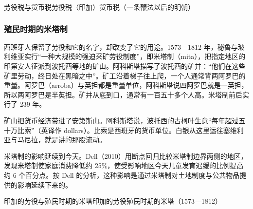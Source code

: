 \begin{compare}{劳役税与货币税}{劳役税（印加）}{货币税（一条鞭法以后的明朝）}
\end{compare}

\subsubsection{殖民时期的米塔制}
西班牙人保留了劳役和它的名字，却改变了它的用途。1573—1812 年，秘鲁与玻利维亚实行“一种大规模的强迫采矿劳役制度”，即米塔制（mita）\cite{dell2010}，把指定地区的印第安人征派到波托西等地的矿山。阿科斯塔描写了波托西的矿井：“他们在这些矿里劳动，终日处在黑暗之中”\cite{acosta1880}。矿工沿着梯子往上爬，一个人通常背两阿罗巴的重量。阿罗巴（arroba）与英担都是重量单位，阿科斯塔说四阿罗巴就是一英担，所以两阿罗巴是半英担。矿井从底到口，通常有一百五十多个人高\cite{acosta1880}。米塔制前后实行了 239 年。

矿山把货币经济带进了安第斯山。阿科斯塔说，波托西的古柯叶生意“每年超过五十万比索”（英译作 dollars）\cite{acosta1880}。比索是西班牙的货币单位。白银从这里运往塞维利亚与马尼拉，就是讲的那股流动。

米塔制的影响延续到今天。Dell（2010）用断点回归比较米塔制边界两侧的地区，发现米塔制使家庭消费降低约 25\%，使受影响地区今天儿童发育迟缓的比例提高约 6 个百分点。按 Dell 的分析，这种影响是通过米塔制对土地制度与公共物品提供的影响延续下来的\cite{dell2010}。

\begin{compare}{印加的劳役与殖民时期的米塔}{印加的劳役}{殖民时期的米塔（1573—1812）}
\end{compare}

